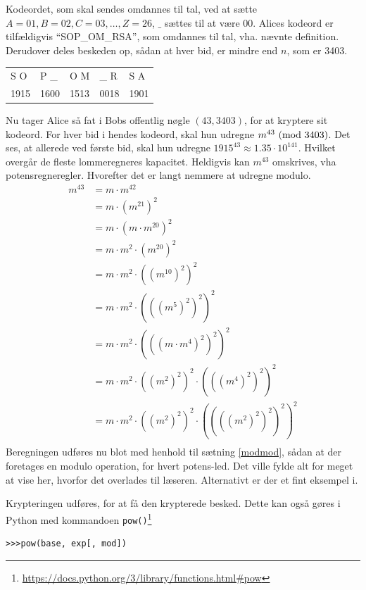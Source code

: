 \begin{eks}
    Kodeordet, som skal sendes omdannes til tal, ved at sætte \(A=01, B=02, C=03, \hdots , Z=26\), \(\_\) sættes til at være 00.
    Alices kodeord er tilfældigvis ``SOP\_OM\_RSA'', som omdannes til tal, vha. nævnte definition.
    Derudover deles beskeden op, sådan at hver bid, er mindre end \(n\), som er 3403.
    \begin{center}
        \begin{tabular}{l l l l l}
            S O  & P \_  & O M  & \_ R  & S A\\
            1915 & 1600  & 1513  & 0018   & 1901\\
        \end{tabular}
    \end{center}

    Nu tager Alice så fat i Bobs offentlig nøgle \((43, 3403)\), for at kryptere sit kodeord.
    For hver bid i hendes kodeord, skal hun udregne \(m^{43} \ (\mathrm{mod}\ 3403)\).
    Det ses, at allerede ved første bid, skal hun udregne \(1915^{43} \approx 1.35 \cdot 10^{141}\).
    Hvilket overgår de fleste lommeregneres kapacitet.
    Heldigvis kan \(m^{43}\) omskrives, vha potensregneregler. Hvorefter det er langt nemmere at udregne modulo.
    \begin{align*}
        m^{43} &= m \cdot m^{42}\\
        &= m \cdot (m^{21})^2\\
        &= m \cdot (m \cdot m^{20})^2\\
        &= m \cdot m^2 \cdot (m^{20})^2\\
        &= m \cdot m^2 \cdot ((m^{10})^2)^2\\
        &= m \cdot m^2 \cdot (((m^5)^2)^2)^2\\
        &= m \cdot m^2 \cdot (((m \cdot m^4)^2)^2)^2\\
        &= m \cdot m^2 \cdot ((m^2)^2)^2 \cdot (((m^4)^2)^2)^2\\
        &= m \cdot m^2 \cdot ((m^2)^2)^2 \cdot ((((m^2)^2)^2)^2)^2\\
    \end{align*}
    Beregningen udføres nu blot med henhold til sætning \ref{modmod}, sådan at der foretages en modulo operation, for hvert potens-led.
    Det ville fylde alt for meget at vise her, hvorfor det overlades til læseren. Alternativt er der et fint eksempel i. \cite[104]{krypto}
    \par
    Krypteringen udføres, for at få den krypterede besked.
    Dette kan også gøres i Python med kommandoen \texttt{pow()}\footnote{\url{https://docs.python.org/3/library/functions.html\#pow}}
    \begin{verbatim}
>>>pow(base, exp[, mod])
    \end{verbatim}


\end{eks}
